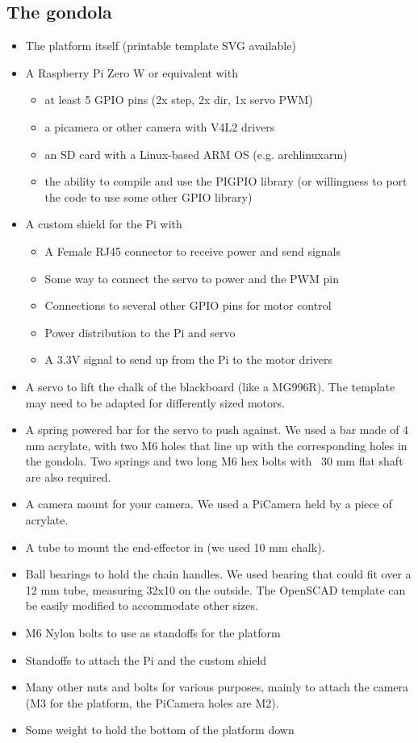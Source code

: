 \documentclass[a4paper,10pt]{article}
\begin{document}
\subsection*{The gondola}
\begin{itemize}
  \item The platform itself (printable template SVG available)
  \item A Raspberry Pi Zero W or equivalent with
  \begin{itemize}
    \item at least 5 GPIO pins (2x step, 2x dir, 1x servo PWM)
    \item a picamera or other camera with V4L2 drivers
    \item an SD card with a Linux-based ARM OS (e.g. archlinuxarm)
    \item the ability to compile and use the PIGPIO library (or
          willingness to port the code to use some other GPIO library)
  \end{itemize}
  \item A custom shield for the Pi with
  \begin{itemize}
    \item A Female RJ45 connector to receive power and send signals
    \item Some way to connect the servo to power and the PWM pin
    \item Connections to several other GPIO pins for motor control
    \item Power distribution to the Pi and servo
    \item A 3.3V signal to send up from the Pi to the motor drivers
  \end{itemize}
  \item A servo to lift the chalk of the blackboard (like a MG996R). The template may need to be adapted for differently sized motors.
  \item A spring powered bar for the servo to push against. We used a bar made of 4 mm acrylate, with two M6 holes that line up with the corresponding holes in the gondola. Two springs and two long M6 hex bolts with ~30 mm flat shaft are also required.
  \item A camera mount for your camera. We used a PiCamera held by a piece of acrylate.
  \item A tube to mount the end-effector in (we used 10 mm chalk).
  \item Ball bearings to hold the chain handles. We used bearing that could fit over a 12 mm tube, measuring 32x10 on the outside. The OpenSCAD template can be easily modified to accommodate other sizes.
  \item M6 Nylon bolts to use as standoffs for the platform
  \item Standoffs to attach the Pi and the custom shield
  \item Many other nuts and bolts for various purposes, mainly to attach the camera (M3 for the platform, the PiCamera holes are M2).
  \item Some weight to hold the bottom of the platform down
\end{itemize}
\end{document}
